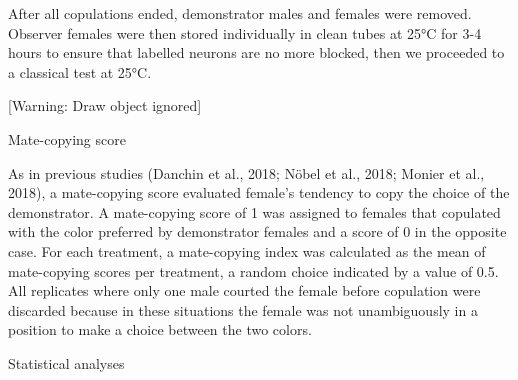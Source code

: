 \documentclass{article}
\begin{document}
\bigskip

After all copulations ended, demonstrator males and females were removed. Observer females were then stored individually in clean tubes at 25°C for 3-4 hours to ensure that labelled neurons are no more blocked, then we proceeded to a classical test at 25°C.


\bigskip


\bigskip

[Warning: Draw object ignored]


\bigskip


\bigskip


\bigskip


\bigskip


\bigskip


\bigskip


\bigskip


\bigskip


\bigskip


\bigskip

Mate-copying score


\bigskip

As in previous studies (Danchin et al., 2018; Nöbel et al., 2018; Monier et al., 2018), a mate-copying score evaluated female’s tendency to copy the choice of the demonstrator. A mate-copying score of 1 was assigned to females that copulated with the color preferred by demonstrator females and a score of 0 in the opposite case. For each treatment, a mate-copying index was calculated as the mean of mate-copying scores per treatment, a random choice indicated by a value of 0.5. All replicates where only one male courted the female before copulation were discarded because in these situations the female was not unambiguously in a position to make a choice between the two colors.


\bigskip


\bigskip

Statistical analyses


\bigskip
\end{document}
